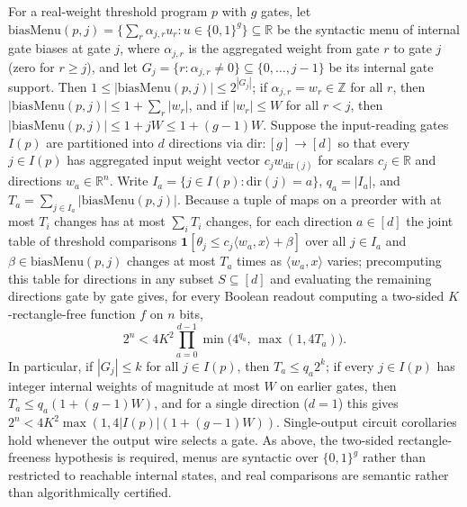 \begin{result}
For a real-weight threshold program $p$ with $g$ gates, let
$\mathrm{biasMenu}(p,j)=\{\sum_{r}\alpha_{j,r}u_r:u\in\{0,1\}^g\}\subseteq\mathbb R$
be the syntactic menu of internal gate biases at gate $j$, where $\alpha_{j,r}$
is the aggregated weight from gate $r$ to gate $j$ (zero for $r\ge j$), and let
$G_j=\{r: \alpha_{j,r}\ne 0\}\subseteq\{0,\dots,j-1\}$ be its internal gate
support. Then $1\le|\mathrm{biasMenu}(p,j)|\le 2^{|G_j|}$; if $\alpha_{j,r}=w_r\in\mathbb Z$
for all $r$, then $|\mathrm{biasMenu}(p,j)|\le 1+\sum_r|w_r|$, and if $|w_r|\le W$
for all $r<j$, then $|\mathrm{biasMenu}(p,j)|\le 1+jW\le 1+(g-1)W$.
Suppose the input-reading gates $I(p)$ are partitioned into $d$ directions via
$\mathrm{dir}:[g]\to[d]$ so that every $j\in I(p)$ has aggregated input weight
vector $c_j w_{\mathrm{dir}(j)}$ for scalars $c_j\in\mathbb R$ and directions
$w_a\in\mathbb R^n$. Write $I_a=\{j\in I(p):\mathrm{dir}(j)=a\}$, $q_a=|I_a|$,
and $T_a=\sum_{j\in I_a}|\mathrm{biasMenu}(p,j)|$. Because a tuple of maps on a
preorder with at most $T_i$ changes has at most $\sum_i T_i$ changes, for each
direction $a\in[d]$ the joint table of threshold comparisons
$\mathbf 1[\theta_j\le c_j\langle w_a,x\rangle+\beta]$ over all $j\in I_a$ and
$\beta\in\mathrm{biasMenu}(p,j)$ changes at most $T_a$ times as
$\langle w_a,x\rangle$ varies; precomputing this table for directions in any
subset $S\subseteq[d]$ and evaluating the remaining directions gate by gate
gives, for every Boolean readout computing a two-sided $K$-rectangle-free
function $f$ on $n$ bits,
\[
2^n < 4K^2\prod_{a=0}^{d-1}\min\!\big(4^{q_a},\,\max(1,4T_a)\big).
\]
In particular, if $|G_j|\le k$ for all $j\in I(p)$, then $T_a\le q_a 2^k$; if
every $j\in I(p)$ has integer internal weights of magnitude at most $W$ on
earlier gates, then $T_a\le q_a(1+(g-1)W)$, and for a single direction ($d=1$)
this gives $2^n<4K^2\max(1,4|I(p)|(1+(g-1)W))$. Single-output circuit
corollaries hold whenever the output wire selects a gate. As above, the
two-sided rectangle-freeness hypothesis is required, menus are syntactic over
$\{0,1\}^g$ rather than restricted to reachable internal states, and real
comparisons are semantic rather than algorithmically certified.\citep{ThresholdCircuitRepresentations2026}

\end{result}
